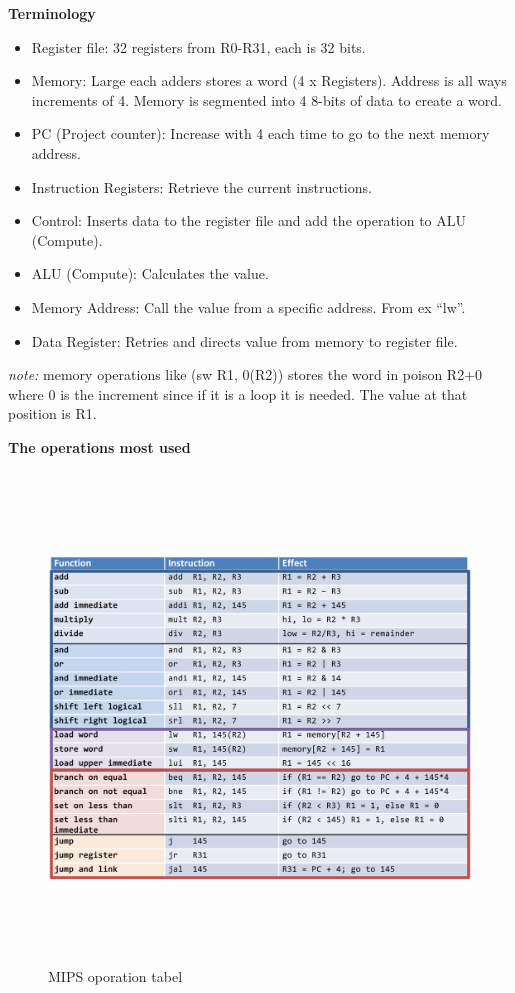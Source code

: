 \documentclass{article}
\begin{document}
\noindent\textbf{Terminology} \newline
\begin{itemize}
\item  Register file: 32 registers from R0-R31, each is 32 bits.
\item  Memory: Large each adders stores a word (4 x Registers). Address is all ways increments of 4.
       Memory is segmented into 4 8-bits of data to create a word.
\item  PC (Project counter): Increase with 4 each time to go to the next memory address.
\item  Instruction Registers: Retrieve the current instructions.
\item  Control: Inserts data to the register file and add the operation to ALU (Compute).
\item  ALU (Compute): Calculates the value.
\item  Memory Address: Call the value from a specific address. From ex ``lw''.
\item  Data Register: Retries and directs value from memory to register file.
\end{itemize}

\newpage
\emph{note:} memory operations like (sw R1, 0(R2)) stores the word in poison R2+0 where 0 is the increment
since if it is a loop it is needed. The value at that position is R1. 

\noindent\textbf{The operations most used} \newline
\begin{figure}[h]
    \vspace{10mm}
    \centering
    \includegraphics[width=16cm, height=13cm]{image/mips-tabel.png} 
    \caption{MIPS oporation tabel}
\end{figure}
\end{document}
